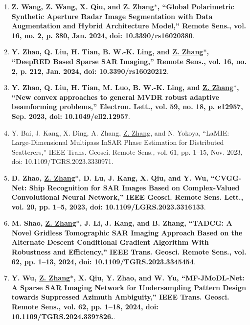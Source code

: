 \documentclass[paper=a4,fontsize=11pt]{scrartcl}
\begin{document}
\begin{enumerate}
\item \textbf{Z. Wang, Z. Wang, X. Qiu, and \underline{Z. Zhang$\ast$}, ``Global Polarimetric Synthetic Aperture Radar Image Segmentation with Data Augmentation and Hybrid Architecture Model,'' Remote Sens., vol. 16, no. 2, p. 380, Jan. 2024, doi: 10.3390/rs16020380}.

\item \textbf{Y. Zhao, Q. Liu, H. Tian, B. W.-K. Ling, and \underline{Z. Zhang$\ast$}, ``DeepRED Based Sparse SAR Imaging,'' Remote Sens., vol. 16, no. 2, p. 212, Jan. 2024, doi: 10.3390/rs16020212}.

\item \textbf{Y. Zhao, Q. Liu, H. Tian, M. Luo, B. W.-K. Ling, and \underline{Z. Zhang$\ast$}, ``New convex approaches to general MVDR robust adaptive beamforming problems,'' Electron. Lett., vol. 59, no. 18, p. e12957, Sep. 2023, doi: 10.1049/ell2.12957}.
	
\item Y. Bai, J. Kang, X. Ding, A. Zhang, \underline{Z. Zhang}, and N. Yokoya, ``LaMIE: Large-Dimensional Multipass InSAR Phase Estimation for Distributed Scatterers,'' IEEE Trans. Geosci. Remote Sens., vol. 61, pp. 1–15, Nov. 2023, doi: 10.1109/TGRS.2023.3330971.


\item \textbf{D. Zhao, \underline{Z. Zhang$\ast$}, D. Lu, J. Kang, X. Qiu, and Y. Wu, ``CVGG-Net: Ship Recognition for SAR Images Based on Complex-Valued Convolutional Neural Network,'' IEEE Geosci. Remote Sens. Lett., vol. 20, pp. 1–5, 2023, doi: 10.1109/LGRS.2023.3316133}.​
	
\item \textbf{M. Shao, \underline{Z. Zhang$\ast$}, J. Li, J. Kang, and B. Zhang, ``TADCG: A Novel Gridless Tomographic SAR Imaging Approach Based on the Alternate Descent Conditional Gradient Algorithm With Robustness and Efficiency,'' IEEE Trans. Geosci. Remote Sens., vol. 62, pp. 1–13, 2024, doi: 10.1109/TGRS.2023.3345454}.
	
\item \textbf{Y. Wu, \underline{Z. Zhang$\ast$}, X. Qiu, Y. Zhao, and W. Yu, ``MF-JMoDL-Net: A Sparse SAR Imaging Network for Undersampling Pattern Design towards Suppressed Azimuth Ambiguity,'' IEEE Trans. Geosci. Remote Sens., vol. 62, pp. 1–18, 2024, doi: 10.1109/TGRS.2024.3397826.}.


\end{enumerate}
\end{document}
